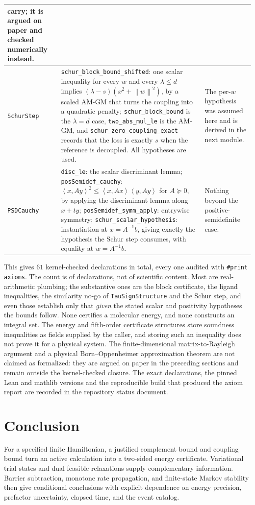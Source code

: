 \documentclass[11pt,a4paper]{article}
\theoremstyle{plain}
\theoremstyle{definition}
\theoremstyle{remark}
\newcommand{\norm}[1]{\left\lVert #1\right\rVert}
\newcommand{\ip}[2]{\left\langle #1,#2\right\rangle}
\begin{document}
\begin{longtable}{@{}>{\raggedright\arraybackslash}p{}>{\raggedright\arraybackslash}p{}>{\raggedright\arraybackslash}p{}@{}}
carry; it is argued on paper and checked numerically instead. \\
\hline
\texttt{SchurStep} &
\texttt{schur\_block\_bound\_shifted}: one scalar inequality for every $w$ and
every $\lambda\le d$ implies $(\lambda-s)(x^{2}+\norm{w}^{2})$, by a scaled
AM-GM that turns the coupling into a quadratic penalty;
\texttt{schur\_block\_bound} is the $\lambda=d$ case,
\texttt{two\_abs\_mul\_le} is the AM-GM, and
\texttt{schur\_zero\_coupling\_exact} records that the loss is exactly $s$ when
the reference is decoupled. All hypotheses are used. &
The per-$w$ hypothesis was assumed here and is derived in the next module. \\
\hline
\texttt{PSDCauchy} &
\texttt{disc\_le}: the scalar discriminant lemma;
\texttt{posSemidef\_cauchy}: $\ip{x}{Ay}^{2}\le\ip{x}{Ax}\ip{y}{Ay}$ for
$A\succeq0$, by applying the discriminant lemma along $x+ty$;
\texttt{posSemidef\_symm\_apply}: entrywise symmetry;
\texttt{schur\_scalar\_hypothesis}: instantiation at $x=A^{-1}b$, giving exactly
the hypothesis the Schur step consumes, with equality at $w=A^{-1}b$. &
Nothing beyond the positive-semidefinite case. \\
\hline
\end{longtable}

This gives $61$ kernel-checked declarations in total, every one audited with
\texttt{\#print axioms}. The count is of declarations, not of scientific
content. Most are real-arithmetic plumbing; the substantive ones are the block
certificate, the ligand inequalities, the similarity no-go of
\texttt{TauSignStructure} and the Schur step, and even those establish only that
\emph{given} the stated scalar and positivity hypotheses the bounds follow. None
certifies a molecular energy, and none constructs an integral set. The energy and
fifth-order certificate structures store soundness inequalities as fields
supplied by the caller, and storing such an inequality does not prove it for a
physical system. The finite-dimensional matrix-to-Rayleigh argument and a
physical Born--Oppenheimer approximation theorem are not claimed as formalized:
they are argued on paper in the preceding sections and remain outside the
kernel-checked closure. The exact declarations, the pinned
Lean and mathlib versions and the reproducible build that produced the axiom
report are recorded in the repository status document.

\section{Conclusion}
For a specified finite Hamiltonian, a justified complement bound and coupling
bound turn an active calculation into a two-sided energy certificate.
Variational trial states and dual-feasible relaxations supply complementary
information. Barrier subtraction, monotone rate propagation, and finite-state
Markov stability then give conditional conclusions with explicit dependence on
energy precision, prefactor uncertainty, elapsed time, and the event catalog.
\end{document}
